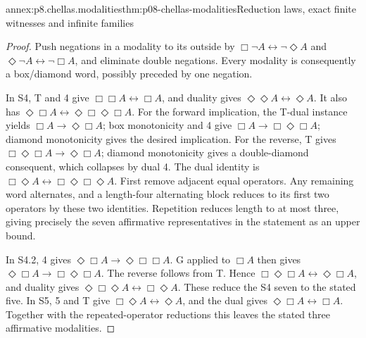 \begin{annexitem}{annex:p8.chellas.modalities}{thm:p08-chellas-modalities}{Reduction laws, exact finite witnesses and infinite families}
\begin{proof}
Push negations in a modality to its outside by
\(\Box\neg A\leftrightarrow\neg\Diamond A\) and
\(\Diamond\neg A\leftrightarrow\neg\Box A\), and eliminate
double negations. Every modality is consequently a box/diamond
word, possibly preceded by one negation.

In S4, T and 4 give \(\Box\Box A\leftrightarrow\Box A\),
and duality gives \(\Diamond\Diamond A\leftrightarrow\Diamond A\).
It also has
\(\Diamond\Box A\leftrightarrow
\Diamond\Box\Diamond\Box A\).
For the forward implication, the T-dual instance yields
\(\Box A\to\Diamond\Box A\); box monotonicity and 4
give \(\Box A\to\Box\Diamond\Box A\); diamond
monotonicity gives the desired implication. For the reverse,
T gives \(\Box\Diamond\Box A\to\Diamond\Box A\);
diamond monotonicity gives a double-diamond consequent,
which collapses by dual 4. The dual identity is
\(\Box\Diamond A\leftrightarrow
\Box\Diamond\Box\Diamond A\).
First remove adjacent equal operators. Any remaining word
alternates, and a length-four alternating block reduces to its
first two operators by these two identities. Repetition reduces
length to at most three, giving precisely the seven affirmative
representatives in the statement as an upper bound.

In S4.2, 4 gives
\(\Diamond\Box A\to\Diamond\Box\Box A\).
G applied to \(\Box A\) then gives
\(\Diamond\Box A\to\Box\Diamond\Box A\).
The reverse follows from T. Hence
\(\Box\Diamond\Box A\leftrightarrow\Diamond\Box A\),
and duality gives
\(\Diamond\Box\Diamond A\leftrightarrow\Box\Diamond A\).
These reduce the S4 seven to the stated five. In S5, 5 and T
give \(\Box\Diamond A\leftrightarrow\Diamond A\), and
the dual gives \(\Diamond\Box A\leftrightarrow\Box A\).
Together with the repeated-operator reductions this leaves the
stated three affirmative modalities.


\end{proof}
\end{annexitem}
